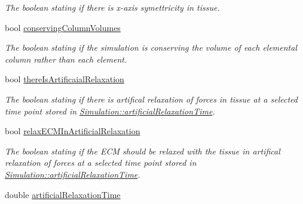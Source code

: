 \begin{DoxyCompactItemize}
\begin{DoxyCompactList}\small\item\em The boolean stating if there is x-\/axis symettricity in tissue. \end{DoxyCompactList}\item 
\hypertarget{classSimulation_a1dd66be606281f44c05ec6b4f8eed882}{}bool \hyperlink{classSimulation_a1dd66be606281f44c05ec6b4f8eed882}{conserving\+Column\+Volumes}\label{classSimulation_a1dd66be606281f44c05ec6b4f8eed882}

\begin{DoxyCompactList}\small\item\em The boolean stating if the simulation is conserving the volume of each elemental column rather than each element. \end{DoxyCompactList}\item 
\hypertarget{classSimulation_adabe1c2bf2cb95e122fe157ddf4c170e}{}bool \hyperlink{classSimulation_adabe1c2bf2cb95e122fe157ddf4c170e}{there\+Is\+Artificaial\+Relaxation}\label{classSimulation_adabe1c2bf2cb95e122fe157ddf4c170e}

\begin{DoxyCompactList}\small\item\em The boolean stating if there is artifical relaxation of forces in tissue at a selected time point stored in \hyperlink{classSimulation_a7a394751dc6e09dec25db763d94cbdf9}{Simulation\+::artificial\+Relaxation\+Time}. \end{DoxyCompactList}\item 
\hypertarget{classSimulation_a9cb11c44d4b8ae638fb8c4bdce400c37}{}bool \hyperlink{classSimulation_a9cb11c44d4b8ae638fb8c4bdce400c37}{relax\+E\+C\+M\+In\+Artificial\+Relaxation}\label{classSimulation_a9cb11c44d4b8ae638fb8c4bdce400c37}

\begin{DoxyCompactList}\small\item\em The boolean stating if the E\+C\+M should be relaxed with the tissue in artifical relaxation of forces at a selected time point stored in \hyperlink{classSimulation_a7a394751dc6e09dec25db763d94cbdf9}{Simulation\+::artificial\+Relaxation\+Time}. \end{DoxyCompactList}\item 
\hypertarget{classSimulation_a7a394751dc6e09dec25db763d94cbdf9}{}double \hyperlink{classSimulation_a7a394751dc6e09dec25db763d94cbdf9}{artificial\+Relaxation\+Time}\label{classSimulation_a7a394751dc6e09dec25db763d94cbdf9}


\end{DoxyCompactItemize}
